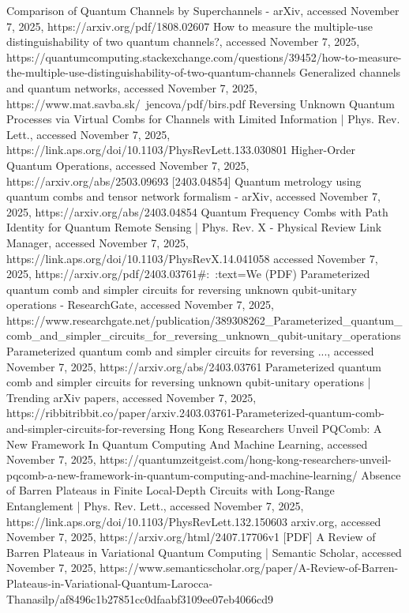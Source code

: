 \documentclass[12pt,a4paper]{article}
\begin{document}
Comparison of Quantum Channels by Superchannels - arXiv, accessed November 7, 2025, https://arxiv.org/pdf/1808.02607
How to measure the multiple-use distinguishability of two quantum channels?, accessed November 7, 2025, https://quantumcomputing.stackexchange.com/questions/39452/how-to-measure-the-multiple-use-distinguishability-of-two-quantum-channels
Generalized channels and quantum networks, accessed November 7, 2025, https://www.mat.savba.sk/~jencova/pdf/birs.pdf
Reversing Unknown Quantum Processes via Virtual Combs for Channels with Limited Information | Phys. Rev. Lett., accessed November 7, 2025, https://link.aps.org/doi/10.1103/PhysRevLett.133.030801
Higher-Order Quantum Operations, accessed November 7, 2025, https://arxiv.org/abs/2503.09693
[2403.04854] Quantum metrology using quantum combs and tensor network formalism - arXiv, accessed November 7, 2025, https://arxiv.org/abs/2403.04854
Quantum Frequency Combs with Path Identity for Quantum Remote Sensing | Phys. Rev. X - Physical Review Link Manager, accessed November 7, 2025, https://link.aps.org/doi/10.1103/PhysRevX.14.041058
accessed November 7, 2025, https://arxiv.org/pdf/2403.03761#:~:text=We%
(PDF) Parameterized quantum comb and simpler circuits for reversing unknown qubit-unitary operations - ResearchGate, accessed November 7, 2025, https://www.researchgate.net/publication/389308262_Parameterized_quantum_comb_and_simpler_circuits_for_reversing_unknown_qubit-unitary_operations
Parameterized quantum comb and simpler circuits for reversing ..., accessed November 7, 2025, https://arxiv.org/abs/2403.03761
Parameterized quantum comb and simpler circuits for reversing unknown qubit-unitary operations | Trending arXiv papers, accessed November 7, 2025, https://ribbitribbit.co/paper/arxiv.2403.03761-Parameterized-quantum-comb-and-simpler-circuits-for-reversing
Hong Kong Researchers Unveil PQComb: A New Framework In Quantum Computing And Machine Learning, accessed November 7, 2025, https://quantumzeitgeist.com/hong-kong-researchers-unveil-pqcomb-a-new-framework-in-quantum-computing-and-machine-learning/
Absence of Barren Plateaus in Finite Local-Depth Circuits with Long-Range Entanglement | Phys. Rev. Lett., accessed November 7, 2025, https://link.aps.org/doi/10.1103/PhysRevLett.132.150603
arxiv.org, accessed November 7, 2025, https://arxiv.org/html/2407.17706v1
[PDF] A Review of Barren Plateaus in Variational Quantum Computing | Semantic Scholar, accessed November 7, 2025, https://www.semanticscholar.org/paper/A-Review-of-Barren-Plateaus-in-Variational-Quantum-Larocca-Thanasilp/af8496c1b27851cc0dfaabf3109ee07eb4066cd9
\end{document}
